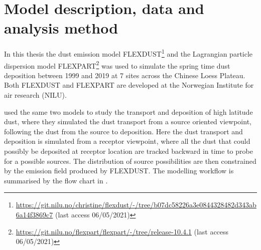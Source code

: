 \chapter{Model description, data and analysis method} 
In this thesis the dust emission model 
FLEXDUST\footnote{\url{https://git.nilu.no/christine/flexdust/-/tree/b07dc58226a3e0844328482d343ab6a14f3869c7} (last access 06/05/2021)} 
\parencite{flexdust_ref_2016} and the Lagrangian particle dispersion model 
FLEXPART\footnote{ \url{https://git.nilu.no/flexpart/flexpart/-/tree/release-10.4.1} (last access 06/05/2021)} 
\parencite{Flexpart10.4_ref} was used to 
simulate the spring time dust deposition between 1999 and 2019 at 7 sites across the Chinese Loess Plateau. Both FLEXDUST and FLEXPART are developed at the Norwegian Institute for air research (NILU). 

\textcite{flexdust_ref_2016} used the same two models to study the transport and deposition of high latitude dust, where they simulated the dust transport from a source oriented viewpoint, following the dust from the source to deposition. Here the dust transport and deposition is simulated from a receptor viewpoint, where all the dust that could possibly be deposited at receptor location are tracked backward in time to probe for a possible sources. The distribution of source possibilities are then constrained by the emission field produced by FLEXDUST. The modelling workflow is summarised by the flow chart in . 

